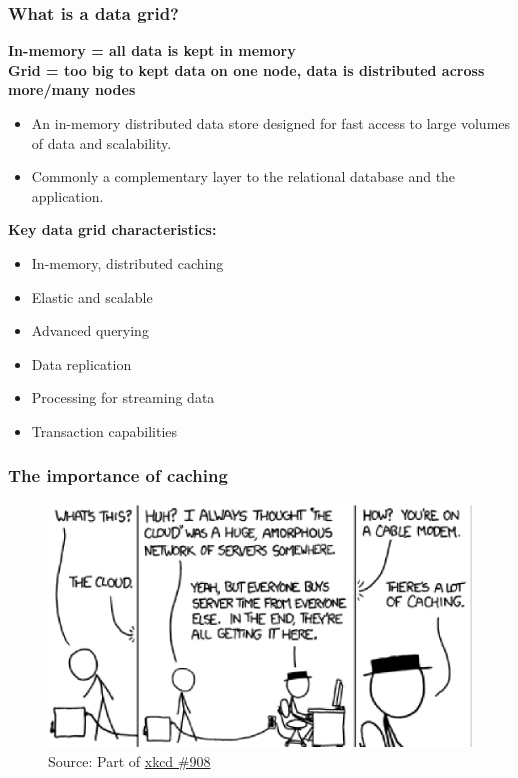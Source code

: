\documentclass[10pt,utf8]{beamer}
\begin{document}
\begin{frame}
	\frametitle{What is a data grid?}
	\centering
	\color{blue}\textbf{
		In-memory = all data is kept in memory \\
		Grid = too big to kept data on one node, data is distributed across more/many nodes
	}\color{black}
	\visible<2,3> {
	\begin{itemize}
	 \item An in-memory distributed data store designed for fast access to large volumes of data and scalability.
	 \item Commonly a complementary layer to the relational database and the application.
	\end{itemize}
  }
	\centering
	 {
	\color{blue}\textbf{Key data grid characteristics:}\color{black}
	\begin{itemize}
	 \item In-memory, distributed caching
	 \item Elastic and scalable
	 \item Advanced querying
	 \item Data replication
	 \item Processing for streaming data
	 \item Transaction capabilities
	\end{itemize}
	}
\end{frame}

\begin{frame}
	\frametitle{The importance of caching}
	\begin{figure}
		\centering
		\includegraphics[width=12cm]{./img/xkcd_908.eps}
		\caption{\tiny{Source: Part of \href{http://xkcd.com/908/}{xkcd \#908}}}
	\end{figure}
\end{frame}
\end{document}
